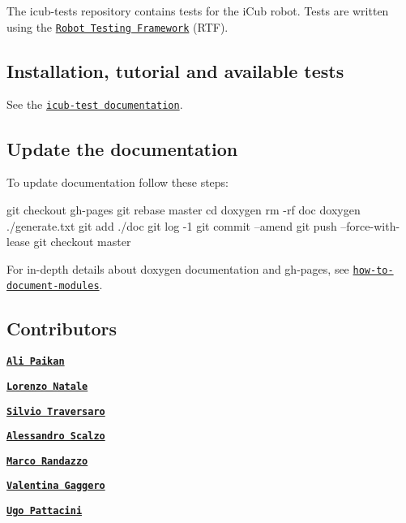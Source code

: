 The {\ttfamily icub-\/tests} repository contains tests for the i\+Cub robot. Tests are written using the \href{https://github.com/robotology/robot-testing}{\tt Robot Testing Framework} (R\+TF).

\subsection*{Installation, tutorial and available tests}

See the \href{https://robotology.github.io/icub-tests/}{\tt icub-\/test documentation}.

\subsection*{Update the documentation}

To update documentation follow these steps\+:


\begin{DoxyCode}
git checkout gh-pages
git rebase master
cd doxygen
rm -rf doc
doxygen ./generate.txt
git add ./doc
git log -1
git commit --amend
git push --force-with-lease
git checkout master
\end{DoxyCode}
 For in-\/depth details about doxygen documentation and gh-\/pages, see \href{https://github.com/robotology/how-to-document-modules}{\tt how-\/to-\/document-\/modules}.

\subsection*{Contributors}


\begin{DoxyItemize}
\item \href{https://github.com/apaikan}{\tt {\bfseries Ali Paikan}}
\item \href{https://github.com/lornat75}{\tt {\bfseries Lorenzo Natale}}
\item \href{https://github.com/traversaro}{\tt {\bfseries Silvio Traversaro}}
\item \href{https://github.com/ale-git}{\tt {\bfseries Alessandro Scalzo}}
\item \href{https://github.com/randaz81}{\tt {\bfseries Marco Randazzo}}
\item \href{https://github.com/valegagge}{\tt {\bfseries Valentina Gaggero}}
\item \href{https://github.com/pattacini}{\tt {\bfseries Ugo Pattacini}} 
\end{DoxyItemize}